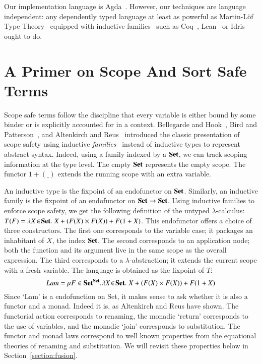 \medskip

Our implementation language is
Agda~\cite{norell2009dependently}. However, our techniques are
language independent: any dependently typed language at least as
powerful as Martin-L\"of Type Theory~\cite{martin1982constructive}
equipped with inductive families~\cite{dybjer1994inductive} such as
Coq~\cite{Coq:manual}, Lean~\cite{DBLP:conf/cade/MouraKADR15} or
Idris~\cite{brady2013idris} ought to do.



\section{A Primer on Scope And Sort Safe Terms}\label{section:primer-term}

Scope safe terms follow the discipline that every variable is
either bound by some binder or is explicitly accounted for in a
context. Bellegarde and Hook~\citeyear{BELLEGARDE1994287}, Bird and Patterson~\citeyear{bird_paterson_1999},
and Altenkirch and Reus~\citeyear{altenkirch1999monadic} introduced the
classic presentation of scope safety using inductive
\emph{families}~\cite{dybjer1994inductive} instead of inductive types to
represent abstract syntax. Indeed, using a family indexed by a $\mathbf{Set}{}$,
we can track scoping information at the type level. The empty $\mathbf{Set}$ represents the empty scope. The functor
$1 + (\_)$ extends the running scope with an extra variable.

An inductive type is the fixpoint of an endofunctor on $\mathbf{Set}{}$.
Similarly, an inductive family is the fixpoint of an endofunctor on
$\mathbf{Set} \to \mathbf{Set}$. Using inductive families to enforce scope safety, we
get the following definition of the untyped $\lambda$-calculus: $T(F)
= \lambda X \!\in\! \mathbf{Set}{}.\; X + (F(X) \times F(X)) + F(1 + X)$.
This endofunctor offers a choice of three constructors.  The first one
corresponds to the variable case; it packages an inhabitant of $X$,
the index $\mathbf{Set}{}$. The second corresponds to an application node;
both the function and its argument live in the same scope as the
overall expression. The third corresponds to a $\lambda$-abstraction;
it extends the current scope with a fresh variable.  The language is
obtained as the fixpoint of $T$:
\[
   \mathit{Lam} = \mu F \in \mathbf{Set}{}^{\mathbf{Set}{}}.
   \lambda X \!\in\! \mathbf{Set}{}.\; X + (F(X) \times F(X)) + F(1 + X)
\]
Since `Lam' is a endofunction on Set, it makes
sense to ask whether it is also a functor and a monad. Indeed it is,
as Altenkirch and Reus have shown. The functorial action corresponds
to renaming, the monadic `return' corresponds to the use of variables,
and the monadic `join' corresponds to substitution. The functor and
monad laws correspond to well known properties from the equational
theories of renaming and substitution. We will revisit these properties
below in Section~\ref{section:fusion}.

